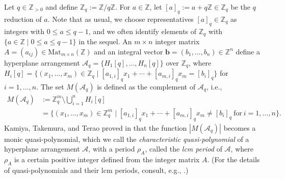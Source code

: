 \documentclass{article}
\theoremstyle{plain}
\theoremstyle{definition}
\theoremstyle{remark}
\numberwithin{equation}{section}
\newcommand{\Ac}{\mathcal{A}}
\newcommand{\ZZ}{\mathbb{Z}}
\begin{document}
Let $q\in\mathbb{Z}_{>0}$ and define $\mathbb{Z}_q:=\mathbb{Z}/q\mathbb{Z}$. 
For $a\in\mathbb{Z}$, let $[a]_q:=a+q\mathbb{Z}\in\mathbb{Z}_q$ be the $q$ reduction of $a$.
Note that as usual, we choose representatives $[a]_q \in \ZZ_q$ as integers with $0 \leq a \leq q-1$, and we often identify elements of $\ZZ_q$ with $\{a \in \ZZ \mid 0 \leq a \leq q-1\}$ in the sequel.   
An $m\times n$ integer matrix $A=(a_{ij})\in\mathrm{Mat}_{m\times n}(\mathbb{Z})$ and an integral vector $\bm{b}=(b_1,\dots,b_n)\in\mathbb{Z}^n$ define a hyperplane arrangement $\Ac_q=\{H_1[q],\dots,H_n[q]\}$ over $\mathbb{Z}_q$, where $H_i[q]=\{(x_1,\dots,x_m)\in\mathbb{Z}_q\mid [a_{1,i}]_q x_1+\cdots+[a_{m,i}]_q x_m=[b_i]_q\}$ for $i=1,\ldots,n$. 
The set $M(\mathcal{A}_q)$ is defined as the complement of $\mathcal{A}_q$, i.e., 
\begin{align*}
M(\mathcal{A}_q)&:=\mathbb{Z}_q^m\setminus\bigcup_{i=1}^n H_i[q] \\
&=\{(x_1,\dots,x_m)\in\mathbb{Z}_q^m\mid [a_{1,i}]_q x_1+\cdots+[a_{m,i}]_q x_m\neq [b_i]_q\ \text{for}\ i=1,\ldots,n\}.
\end{align*}
Kamiya, Takemura, and Terao proved in \cite{KTT08, KTT11} that the function $|M(\mathcal{A}_q)|$ becomes a monic quasi-polynomial, which we call the \textit{characteristic quasi-polynomial} of a hyperplane arrangement $\Ac$, with a period $\rho_A$, called the \textit{lcm period} of $\Ac$, where $\rho_A$ is a certain positive integer defined from the integer matrix $A$. 
(For the details of quasi-polynomials and their lcm periods, consult, e.g., \cite[Subsection 2.1]{HN2024}.) 
\end{document}
